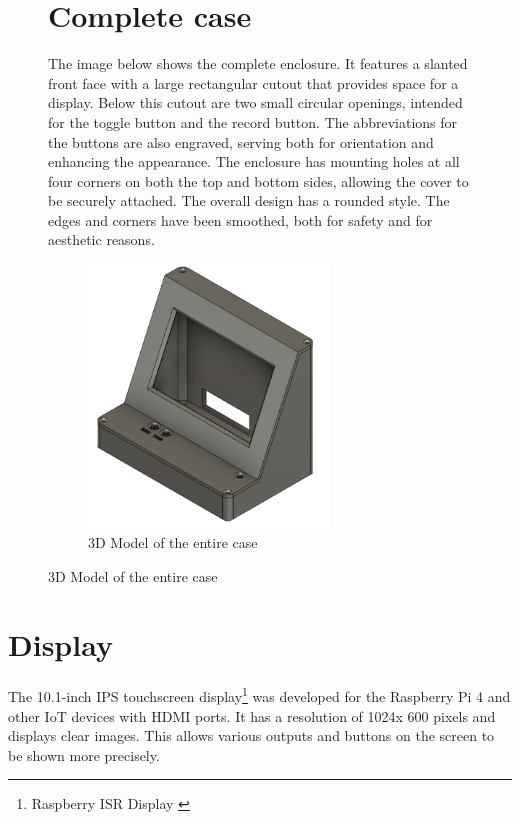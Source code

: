 \begin{figure}[H]
  \section{Complete case}
  The image below shows the complete enclosure. It features a slanted front face with a large rectangular cutout that provides space for a display. Below this cutout are two small circular openings, intended for the toggle button and the record button. The abbreviations for the buttons are also engraved, serving both for orientation and enhancing the appearance.
  The enclosure has mounting holes at all four corners on both the top and bottom sides, allowing the cover to be securely attached. The overall design has a rounded style. The edges and corners have been smoothed, both for safety and for aesthetic reasons.
  \begin{figure}[H]
    \centering
    \includegraphics[width=0.7\textwidth]{assets/DG_komplett(1)}
    \caption{3D Model of the entire case}
  \end{figure}
\end{figure}

\section{Display}
The 10.1-inch IPS touchscreen display\footnote{Raspberry ISR Display \cite{display}} was developed for the Raspberry Pi 4 and other IoT devices with HDMI ports.
It has a resolution of 1024x 600 pixels and displays clear images. This allows various outputs and buttons on the screen to be shown more precisely.

